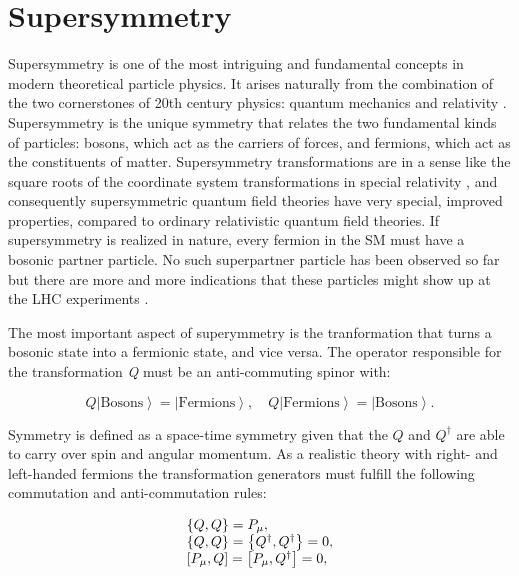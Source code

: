 \clearpage

\section{Supersymmetry}

Supersymmetry is one of the most intriguing and fundamental concepts in modern theoretical particle physics. It arises naturally from the combination of the two cornerstones of 20th century physics: quantum mechanics and relativity \cite{Miller:2013jra}. Supersymmetry is the unique symmetry that relates the two fundamental kinds of particles: bosons, which act as the carriers of forces, and fermions, which act as the constituents of matter. Supersymmetry transformations are in a sense like the square roots of the coordinate system transformations in special relativity \cite{Miller:2013jra}, and consequently supersymmetric quantum field theories have very special, improved properties, compared to ordinary relativistic quantum field theories. If supersymmetry is realized in nature, every fermion in the SM must have a bosonic partner particle. No such superpartner particle has been observed so far but there are more and more indications that these particles might show up at the LHC experiments \cite{Athron:2011wu}.

The most important aspect of superymmetry is the tranformation that turns a bosonic state into a fermionic state, and vice versa. The operator responsible for the transformation \textit{Q} must be an anti-commuting spinor with:

\begin{equation}
Q\left|\text{Bosons}\right> = \left|\text{Fermions}\right>, \quad Q\left|\text{Fermions}\right> = \left|\text{Bosons}\right>. 
\end{equation}

Symmetry is defined as a space-time symmetry given that the $Q$ and $Q^{\dagger}$ are able to carry over spin and angular momentum. As a realistic theory with right- and left-handed fermions the transformation generators must fulfill the following commutation and anti-commutation rules:

\begin{equation}
\begin{array}{l c l}
\left\{Q, Q\right\} = P_{\mu}, \\
\left\{Q, Q\right\} = \left\{Q^{\dagger}, Q^{\dagger}\right\} = 0, \\
\left[P_{\mu}, Q\right] = \left[P_{\mu}, Q^{\dagger}\right] = 0,
\end{array}
\end{equation}

